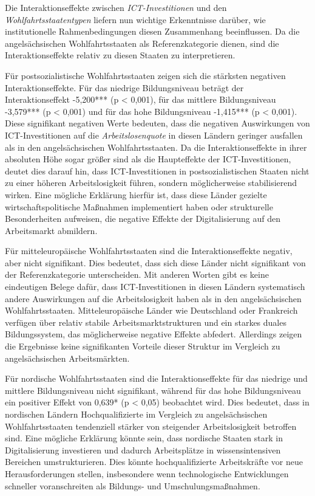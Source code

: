 Die Interaktionseffekte zwischen \textit{\ac{ICT}-Investitionen} und den 
\textit{Wohlfahrtsstaatentypen} liefern nun wichtige Erkenntnisse darüber, wie institutionelle 
Rahmenbedingungen diesen Zusammenhang beeinflussen. Da die angelsächsischen Wohlfahrtsstaaten 
als Referenzkategorie dienen, sind die Interaktionseffekte relativ zu diesen Staaten zu 
interpretieren.

Für postsozialistische Wohlfahrtsstaaten zeigen sich die stärksten negativen Interaktionseffekte. 
Für das niedrige Bildungsniveau beträgt der Interaktionseffekt -5,200*** (p < 0,001), für das 
mittlere Bildungsniveau -3,579*** (p < 0,001) und für das hohe Bildungsniveau -1,415*** 
(p < 0,001). Diese signifikant negativen Werte bedeuten, dass die negativen Auswirkungen von 
\ac{ICT}-Investitionen auf die \textit{Arbeitslosenquote} in diesen Ländern geringer ausfallen 
als in den angelsächsischen Wohlfahrtsstaaten. Da die Interaktionseffekte in ihrer absoluten Höhe 
sogar größer sind als die Haupteffekte der \ac{ICT}-Investitionen, deutet dies darauf hin, dass 
\ac{ICT}-Investitionen in postsozialistischen Staaten nicht zu einer höheren Arbeitslosigkeit 
führen, sondern möglicherweise stabilisierend wirken. Eine mögliche Erklärung hierfür ist, dass 
diese Länder gezielte wirtschaftspolitische Maßnahmen implementiert haben oder strukturelle 
Besonderheiten aufweisen, die negative Effekte der Digitalisierung auf den Arbeitsmarkt abmildern.

Für mitteleuropäische Wohlfahrtsstaaten sind die Interaktionseffekte negativ, aber nicht 
signifikant. Dies bedeutet, dass sich diese Länder nicht signifikant von der Referenzkategorie 
unterscheiden. Mit anderen Worten gibt es keine eindeutigen Belege dafür, dass 
\ac{ICT}-Investitionen in diesen Ländern systematisch andere Auswirkungen auf die 
Arbeitslosigkeit haben als in den angelsächsischen Wohlfahrtsstaaten. Mitteleuropäische Länder 
wie Deutschland oder Frankreich verfügen über relativ stabile Arbeitsmarktstrukturen und ein 
starkes duales Bildungssystem, das möglicherweise negative Effekte abfedert. Allerdings zeigen 
die Ergebnisse keine signifikanten Vorteile dieser Struktur im Vergleich zu angelsächsischen 
Arbeitsmärkten.

Für nordische Wohlfahrtsstaaten sind die Interaktionseffekte für das niedrige und mittlere 
Bildungsniveau nicht signifikant, während für das hohe Bildungsniveau ein positiver Effekt von 
0,639* (p < 0,05) beobachtet wird. Dies bedeutet, dass in nordischen Ländern Hochqualifizierte 
im Vergleich zu angelsächsischen Wohlfahrtsstaaten tendenziell stärker von steigender 
Arbeitslosigkeit betroffen sind. Eine mögliche Erklärung könnte sein, dass nordische Staaten stark in 
Digitalisierung investieren und dadurch Arbeitsplätze in wissensintensiven Bereichen 
umstrukturieren. Dies könnte hochqualifizierte Arbeitskräfte vor neue Herausforderungen stellen, 
insbesondere wenn technologische Entwicklungen schneller voranschreiten als Bildungs- und 
Umschulungsmaßnahmen.

